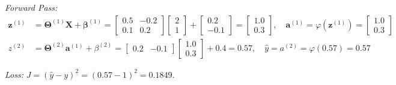 \documentclass{dlproblemset}
\begin{document}
\begin{enumerate}[1)]
    \textit{Forward Pass:}
    \begin{align*}
        \mathbf{z}^{(1)} &= \mathbf{\Theta}^{(1)}\mathbf{X} + \boldsymbol{\beta}^{(1)} = \begin{bmatrix}0.5 & -0.2\\ 0.1 & 0.2\end{bmatrix}\begin{bmatrix}2\\ 1\end{bmatrix} + \begin{bmatrix}0.2\\ -0.1\end{bmatrix} = \begin{bmatrix}1.0\\ 0.3\end{bmatrix}, \quad \mathbf{a}^{(1)}=\varphi(\mathbf{z}^{(1)})=\begin{bmatrix}1.0\\ 0.3\end{bmatrix}\\
        z^{(2)} &= \mathbf{\Theta}^{(2)}\mathbf{a}^{(1)} + \beta^{(2)} = \begin{bmatrix}0.2 & -0.1\end{bmatrix}\begin{bmatrix}1.0\\ 0.3\end{bmatrix} + 0.4 = 0.57, \quad \hat{y}=a^{(2)}=\varphi(0.57)=0.57
    \end{align*}

    \textit{Loss:} $J=(\hat{y}-y)^2 = (0.57-1)^2 = 0.1849$.


\end{enumerate}
\end{document}

